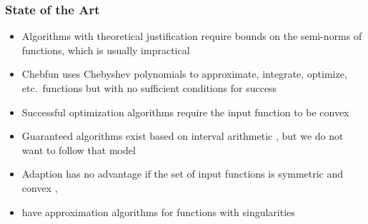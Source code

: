 \documentclass[12pt,compress,xcolor={usenames,dvipsnames}]{beamer} %
\begin{document}
\begin{frame}
	\frametitle{State of the Art}
	
	\vspace{-3ex}
	
	\begin{itemize}
		\item Algorithms with \alert{theoretical justification} require bounds on the semi-norms of functions, which is usually impractical
		
		\item \alert{Chebfun} uses Chebyshev polynomials to approximate, integrate, optimize, etc.\ functions but with no sufficient conditions for success
		
		\item Successful optimization algorithms require the input function to be \alert{convex}
		
		\item Guaranteed algorithms exist based on \alert{interval arithmetic} \cites{Rum99a, Rum10a}, but we do not want to follow that model
		
		\item \alert{Adaption has no advantage} if the set of input functions is symmetric
		and convex \cite[Theorem 1]{Nov96a}, \cite[Chapter 4, Theorem
		5.2.1]{TraWasWoz88}
		
    	\item {} have approximation algorithms for functions with \alert{singularities}
		
		
	\end{itemize}
\end{frame}

\end{document}
